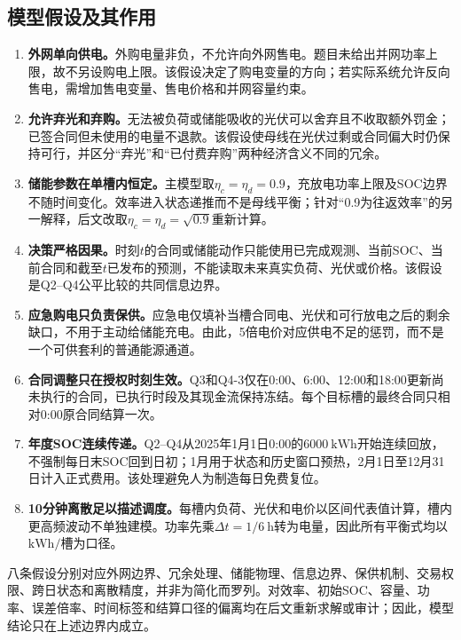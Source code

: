 \documentclass[UTF8,12pt,a4paper]{ctexart}
\theoremstyle{remark}
\begin{document}
\subsection{模型假设及其作用}
\begin{enumerate}
\item \textbf{外网单向供电。}外购电量非负，不允许向外网售电。题目未给出并网功率上限，故不另设购电上限。该假设决定了购电变量的方向；若实际系统允许反向售电，需增加售电变量、售电价格和并网容量约束。
\item \textbf{允许弃光和弃购。}无法被负荷或储能吸收的光伏可以舍弃且不收取额外罚金；已签合同但未使用的电量不退款。该假设使母线在光伏过剩或合同偏大时仍保持可行，并区分“弃光”和“已付费弃购”两种经济含义不同的冗余。
\item \textbf{储能参数在单槽内恒定。}主模型取$\eta_c=\eta_d=0.9$，充放电功率上限及SOC边界不随时间变化。效率进入状态递推而不是母线平衡；针对“0.9为往返效率”的另一解释，后文改取$\eta_c=\eta_d=\sqrt{0.9}$重新计算。
\item \textbf{决策严格因果。}时刻$t$的合同或储能动作只能使用已完成观测、当前SOC、当前合同和截至$t$已发布的预测，不能读取未来真实负荷、光伏或价格。该假设是Q2--Q4公平比较的共同信息边界。
\item \textbf{应急购电只负责保供。}应急电仅填补当槽合同电、光伏和可行放电之后的剩余缺口，不用于主动给储能充电。由此，5倍电价对应供电不足的惩罚，而不是一个可供套利的普通能源通道。
\item \textbf{合同调整只在授权时刻生效。}Q3和Q4-3仅在0:00、6:00、12:00和18:00更新尚未执行的合同，已执行时段及其现金流保持冻结。每个目标槽的最终合同只相对0:00原合同结算一次。
\item \textbf{年度SOC连续传递。}Q2--Q4从2025年1月1日0:00的$6000\ \mathrm{kWh}$开始连续回放，不强制每日末SOC回到日初；1月用于状态和历史窗口预热，2月1日至12月31日计入正式费用。该处理避免人为制造每日免费复位。
\item \textbf{10分钟离散足以描述调度。}每槽内负荷、光伏和电价以区间代表值计算，槽内更高频波动不单独建模。功率先乘$\Delta t=1/6\ \mathrm h$转为电量，因此所有平衡式均以$\mathrm{kWh/槽}$为口径。
\end{enumerate}

八条假设分别对应外网边界、冗余处理、储能物理、信息边界、保供机制、交易权限、跨日状态和离散精度，并非为简化而罗列。对效率、初始SOC、容量、功率、误差倍率、时间标签和结算口径的偏离均在后文重新求解或审计；因此，模型结论只在上述边界内成立。
\end{document}
